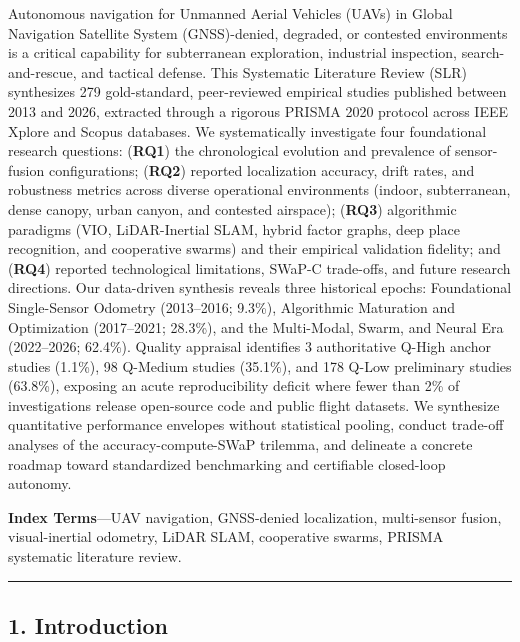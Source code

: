 \documentclass[journal]{IEEEtran}
\begin{document}
Autonomous navigation for Unmanned Aerial Vehicles (UAVs) in Global
Navigation Satellite System (GNSS)-denied, degraded, or contested
environments is a critical capability for subterranean exploration,
industrial inspection, search-and-rescue, and tactical defense. This
Systematic Literature Review (SLR) synthesizes 279 gold-standard,
peer-reviewed empirical studies published between 2013 and 2026,
extracted through a rigorous PRISMA 2020 protocol across IEEE Xplore and
Scopus databases. We systematically investigate four foundational
research questions: (\textbf{RQ1}) the chronological evolution and
prevalence of sensor-fusion configurations; (\textbf{RQ2}) reported
localization accuracy, drift rates, and robustness metrics across
diverse operational environments (indoor, subterranean, dense canopy,
urban canyon, and contested airspace); (\textbf{RQ3}) algorithmic
paradigms (VIO, LiDAR-Inertial SLAM, hybrid factor graphs, deep place
recognition, and cooperative swarms) and their empirical validation
fidelity; and (\textbf{RQ4}) reported technological limitations, SWaP-C
trade-offs, and future research directions. Our data-driven synthesis
reveals three historical epochs: Foundational Single-Sensor Odometry
(2013--2016; 9.3\%), Algorithmic Maturation and Optimization
(2017--2021; 28.3\%), and the Multi-Modal, Swarm, and Neural Era
(2022--2026; 62.4\%). Quality appraisal identifies 3 authoritative
Q-High anchor studies (1.1\%), 98 Q-Medium studies (35.1\%), and 178
Q-Low preliminary studies (63.8\%), exposing an acute reproducibility
deficit where fewer than 2\% of investigations release open-source code
and public flight datasets. We synthesize quantitative performance
envelopes without statistical pooling, conduct trade-off analyses of the
accuracy-compute-SWaP trilemma, and delineate a concrete roadmap toward
standardized benchmarking and certifiable closed-loop autonomy.

\textbf{Index Terms}---UAV navigation, GNSS-denied localization,
multi-sensor fusion, visual-inertial odometry, LiDAR SLAM, cooperative
swarms, PRISMA systematic literature review.

\begin{center}\rule{0.5\linewidth}{0.5pt}\end{center}

\subsection{1. Introduction}\label{introduction}
\end{document}
